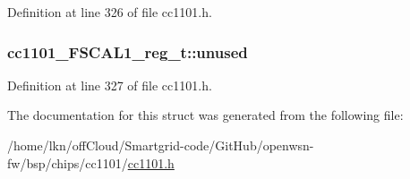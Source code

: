 Definition at line 326 of file cc1101.\+h.

\subsubsection[{\texorpdfstring{unused}{unused}}]{ cc1101\+\_\+\+F\+S\+C\+A\+L1\+\_\+reg\+\_\+t\+::unused}\hypertarget{structcc1101___f_s_c_a_l1__reg__t_a8c11ee62b834cb2ff35df318de642d24}{}\label{structcc1101___f_s_c_a_l1__reg__t_a8c11ee62b834cb2ff35df318de642d24}


Definition at line 327 of file cc1101.\+h.



The documentation for this struct was generated from the following file\+:\begin{DoxyCompactItemize}
\item 
/home/lkn/off\+Cloud/\+Smartgrid-\/code/\+Git\+Hub/openwsn-\/fw/bsp/chips/cc1101/\hyperlink{cc1101_8h}{cc1101.\+h}\end{DoxyCompactItemize}
